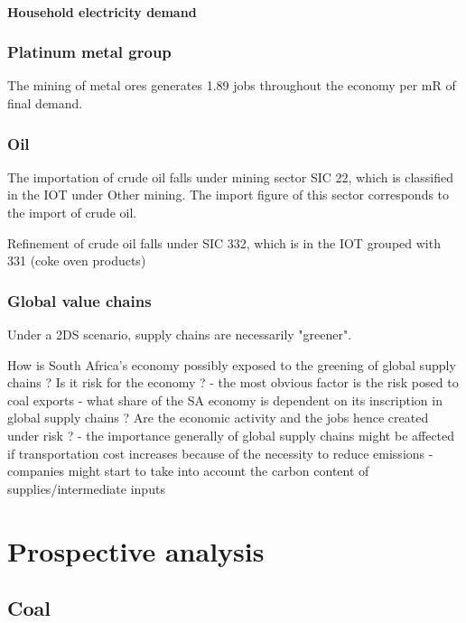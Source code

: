 \documentclass[12pt,english]{article}
\begin{document}

\paragraph{Household electricity demand}



\subsubsection{Platinum metal group}

The mining of metal ores generates 1.89 jobs throughout the economy per mR of final demand. 

\subsubsection{Oil}

The importation of crude oil falls under mining sector SIC 22, which is classified in the IOT under Other mining. The import figure of this sector corresponds to the import of crude oil. 

Refinement of crude oil falls under SIC 332, which is in the IOT grouped with 331 (coke oven products) 

\subsubsection{Global value chains}

Under a 2DS scenario, supply chains are necessarily "greener". 

How is South Africa's economy possibly exposed to the greening of global supply chains ? Is it risk for the economy ?
- the most obvious factor is the risk posed to coal exports
- what share of the SA economy is dependent on its inscription in global supply chains ? Are the economic activity and the jobs hence created under risk ? 
- the importance generally of global supply chains might be affected if transportation cost increases because of the necessity to reduce emissions
- companies might start to take into account the carbon content of supplies/intermediate inputs


\citep{von2016energy}

\clearpage
\section{Prospective analysis}

\subsection{Coal}
\end{document}
